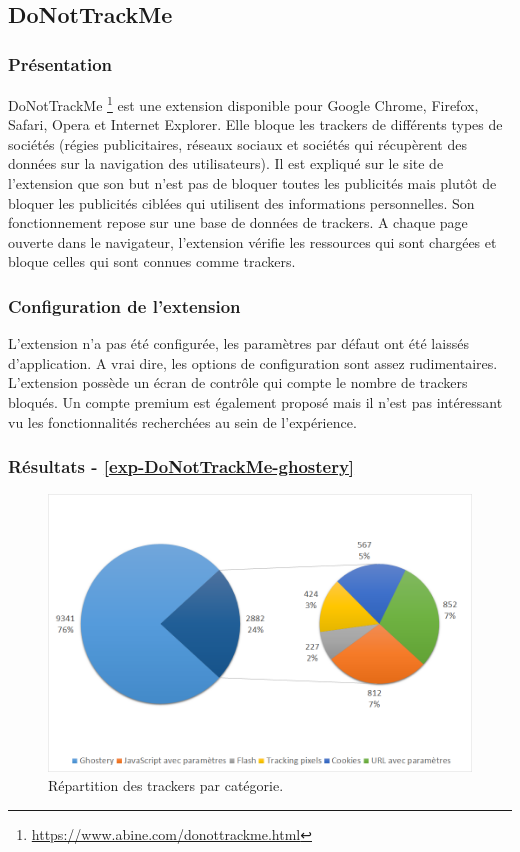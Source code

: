 \subsection{DoNotTrackMe}
\subsubsection{Présentation}
DoNotTrackMe \footnote{\url{https://www.abine.com/donottrackme.html}} est une extension disponible pour Google Chrome, Firefox, Safari, Opera et Internet Explorer.
Elle bloque les trackers de différents types de sociétés (régies publicitaires, réseaux sociaux et sociétés qui récupèrent des données sur la navigation des utilisateurs). Il est expliqué sur le site de l'extension que son but n'est pas de bloquer toutes les publicités mais plutôt de bloquer les publicités ciblées qui utilisent des informations personnelles. Son fonctionnement repose sur une base de données de trackers. A chaque page ouverte dans le navigateur, l'extension vérifie les ressources qui sont chargées et bloque celles qui sont connues comme trackers.

\subsubsection{Configuration de l'extension}
L'extension n'a pas été configurée, les paramètres par défaut ont été laissés d'application. A vrai dire, les options de configuration sont assez rudimentaires. L'extension possède un écran de contrôle qui compte le nombre de trackers bloqués. Un compte premium est également proposé mais il n'est pas intéressant vu les fonctionnalités recherchées au sein de l'expérience.

\subsubsection{Résultats - \autoref{exp-DoNotTrackMe-ghostery}}
\begin{figure}[!h]
	\centering
	\includegraphics[scale=.6]{resultats/ANALYSES/Images/DoNotTrackMe-Ghostery.png}
	\caption{\label{exp-DoNotTrackMe-ghostery}Répartition des trackers par catégorie.}
\end{figure}

